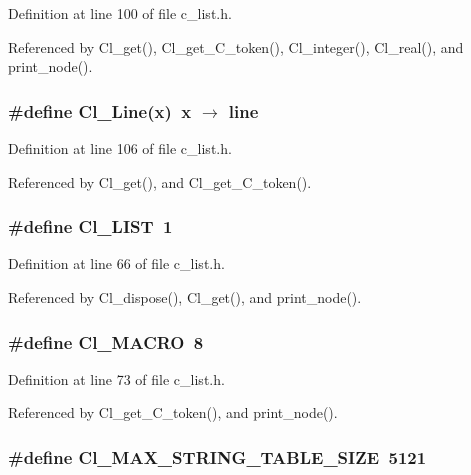 Definition at line 100 of file c\_\-list.h.

Referenced by Cl\_\-get(), Cl\_\-get\_\-C\_\-token(), Cl\_\-integer(), Cl\_\-real(), and print\_\-node().
\subsubsection{\setlength{\rightskip}{0pt plus 5cm}\#define Cl\_\-Line(x)~x $\rightarrow$ line}\label{c__list_8h_69450165ca74d09e53db4e6d666e6f32}




Definition at line 106 of file c\_\-list.h.

Referenced by Cl\_\-get(), and Cl\_\-get\_\-C\_\-token().
\subsubsection{\setlength{\rightskip}{0pt plus 5cm}\#define Cl\_\-LIST~1}\label{c__list_8h_71de343438a5087eb0c0a07de92d26bb}




Definition at line 66 of file c\_\-list.h.

Referenced by Cl\_\-dispose(), Cl\_\-get(), and print\_\-node().
\subsubsection{\setlength{\rightskip}{0pt plus 5cm}\#define Cl\_\-MACRO~8}\label{c__list_8h_307b706234703f666f5e0ff0cbb48d2e}




Definition at line 73 of file c\_\-list.h.

Referenced by Cl\_\-get\_\-C\_\-token(), and print\_\-node().
\subsubsection{\setlength{\rightskip}{0pt plus 5cm}\#define Cl\_\-MAX\_\-STRING\_\-TABLE\_\-SIZE~5121}\label{c__list_8h_23234b76595ccd8eede34f25dc0db7df}




